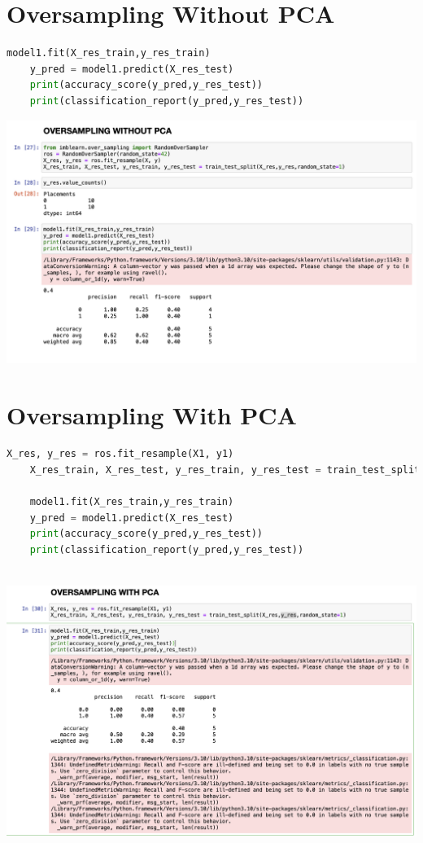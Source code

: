 \documentclass{article}
\begin{document}
\section{Oversampling Without PCA}
\begin{lstlisting}[language=Python]
	model1.fit(X_res_train,y_res_train)
	y_pred = model1.predict(X_res_test)
	print(accuracy_score(y_pred,y_res_test))
	print(classification_report(y_pred,y_res_test))
\end{lstlisting}
\includegraphics[scale=0.45]{images/13.png}


\section{Oversampling With PCA}
\begin{lstlisting}[language=Python]
	X_res, y_res = ros.fit_resample(X1, y1)
	X_res_train, X_res_test, y_res_train, y_res_test = train_test_split(X_res,y_res,random_state=1)
	
	model1.fit(X_res_train,y_res_train)
	y_pred = model1.predict(X_res_test)
	print(accuracy_score(y_pred,y_res_test))
	print(classification_report(y_pred,y_res_test))
	
\end{lstlisting}
\includegraphics[scale=0.45]{images/14.png}
\end{document}
